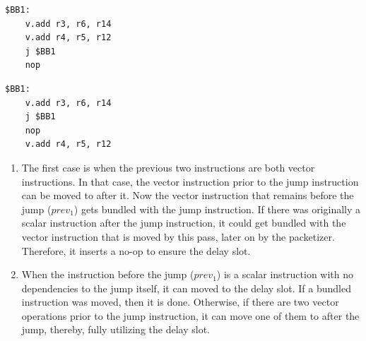 
\label{lst:delayslot1}
\begin{center}
\hspace{2px}\begin{minipage}{.475\textwidth}
\begin{lstlisting}[frame=tlrb]
$BB1:
    v.add r3, r6, r14
    v.add r4, r5, r12
    j $BB1
    nop
\end{lstlisting}
\end{minipage}\hfill
\begin{minipage}{.475\textwidth}
\begin{lstlisting}[frame=tlrb]
$BB1:
    v.add r3, r6, r14
    j $BB1
    nop
    v.add r4, r5, r12
\end{lstlisting}
\end{minipage}
\end{center}

\begin{enumerate}
\item The first case is when the previous two instructions are both vector instructions. In that case, the vector instruction prior to the jump instruction can be moved to after it. Now the vector instruction that remains before the jump ($prev_1$) gets bundled with the jump instruction. If there was originally a scalar instruction after the jump instruction, it could get bundled with the vector instruction that is moved by this pass, later on by the packetizer. Therefore, it inserts a no-op to ensure the delay slot. %
\item When the instruction before the jump ($prev_1$) is a scalar instruction with no dependencies to the jump itself, it can moved to the delay slot. If a bundled instruction was moved, then it is done. Otherwise, if there are two vector operations prior to the jump instruction, it can move one of them to after the jump, thereby, fully utilizing the delay slot.

\end{enumerate}

